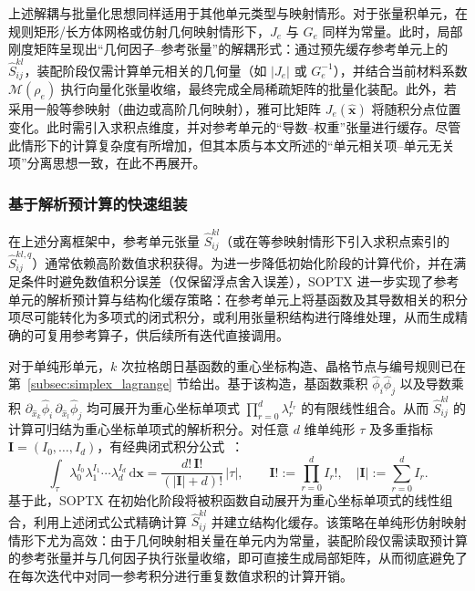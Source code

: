 上述解耦与批量化思想同样适用于其他单元类型与映射情形。对于张量积单元，在规则矩形/长方体网格或仿射几何映射情形下，$J_e$ 与 $G_e$ 同样为常量。此时，局部刚度矩阵呈现出“几何因子{--}参考张量”的解耦形式：通过预先缓存参考单元上的 $\hat{S}_{ij}^{kl}$，装配阶段仅需计算单元相关的几何量（如 $|J_e|$ 或 $G_e^{-1}$），并结合当前材料系数 $\mathcal{M}(\rho_e)$ 执行向量化张量收缩，最终完成全局稀疏矩阵的批量化装配。此外，若采用一般等参映射（曲边或高阶几何映射），雅可比矩阵 $J_e(\hat{\boldsymbol{x}})$ 将随积分点位置变化。此时需引入求积点维度，并对参考单元的“导数{--}权重”张量进行缓存。尽管此情形下的计算复杂度有所增加，但其本质与本文所述的“单元相关项{--}单元无关项”分离思想一致，在此不再展开。

\subsubsection*{基于解析预计算的快速组装}

在上述分离框架中，参考单元张量 $\hat{S}^{kl}_{ij}$（或在等参映射情形下引入求积点索引的 $\hat{S}^{kl,q}_{ij}$）通常依赖高阶数值求积获得。为进一步降低初始化阶段的计算代价，并在满足条件时避免数值积分误差（仅保留浮点舍入误差），SOPTX 进一步实现了参考单元的解析预计算与结构化缓存策略：在参考单元上将基函数及其导数相关的积分项尽可能转化为多项式的闭式积分，或利用张量积结构进行降维处理，从而生成精确的可复用参考算子，供后续所有迭代直接调用。

对于单纯形单元，$k$ 次拉格朗日基函数的重心坐标构造、晶格节点与编号规则已在第~\ref{subsec:simplex_lagrange} 节给出。基于该构造，基函数乘积 $\hat{\phi}_i\hat{\phi}_j$ 以及导数乘积 $\partial_{\hat{x}_k}\hat{\phi}_i\,\partial_{\hat{x}_l}\hat{\phi}_j$ 均可展开为重心坐标单项式 $\prod_{r=0}^{d}\lambda_r^{I_r}$ 的有限线性组合。从而 $\hat{S}^{kl}_{ij}$ 的计算可归结为重心坐标单项式的解析积分。对任意 $d$ 维单纯形 $\tau$ 及多重指标 $\boldsymbol{I}=(I_0,\dots,I_d)$，有经典闭式积分公式~\cite{vermolenIntegrationRuleProducts2018}：
\[
\int_{\tau}\lambda_0^{I_0}\lambda_1^{I_1}\cdots \lambda_d^{I_d}\,\mathrm d\boldsymbol{x} =\frac{d!\,\boldsymbol{I}!}{(|\boldsymbol{I}|+d)!}\,|\tau|, \qquad \boldsymbol{I}!:=\prod_{r=0}^{d}I_r!,\quad |\boldsymbol{I}|:=\sum_{r=0}^{d}I_r.
\]
基于此，SOPTX 在初始化阶段将被积函数自动展开为重心坐标单项式的线性组合，利用上述闭式公式精确计算 $\hat{S}_{ij}^{kl}$ 并建立结构化缓存。该策略在单纯形仿射映射情形下尤为高效：由于几何映射相关量在单元内为常量，装配阶段仅需读取预计算的参考张量并与几何因子执行张量收缩，即可直接生成局部矩阵，从而彻底避免了在每次迭代中对同一参考积分进行重复数值求积的计算开销。


